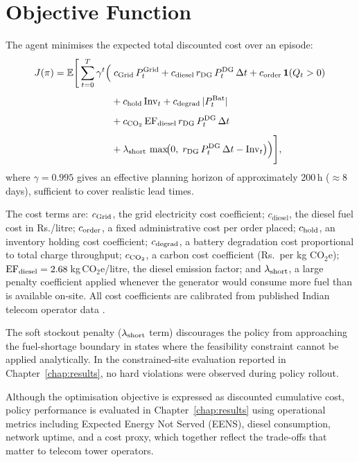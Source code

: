 \section{Objective Function}
\label{sec:objective}

The agent minimises the expected total discounted cost over an episode:
\begin{align}
J(\pi) = \mathbb{E}\Biggl[\,\sum_{t=0}^{T} \gamma^t \Bigl(
    &\;c_{\mathrm{Grid}}\,P_t^{\mathrm{Grid}}
     + c_{\mathrm{diesel}}\,r_{\mathrm{DG}}\,P_t^{\mathrm{DG}}\,\Delta t
     + c_{\mathrm{order}}\,\mathbf{1}(Q_t > 0)
     \notag \\[4pt]
    &+ c_{\mathrm{hold}}\,\mathrm{Inv}_t
     + c_{\mathrm{degrad}}\,|P_t^{\mathrm{Bat}}|
     \notag \\[4pt]
    &+ c_{\mathrm{CO_2}}\,\mathrm{EF}_{\mathrm{diesel}}\,r_{\mathrm{DG}}\,P_t^{\mathrm{DG}}\,\Delta t
     \notag \\[4pt]
    &+ \lambda_{\mathrm{short}}\,\max\!\bigl(0,\;
       r_{\mathrm{DG}}\,P_t^{\mathrm{DG}}\,\Delta t - \mathrm{Inv}_t\bigr)
\Bigr)\Biggr],
\label{eq:objective}
\end{align}
where $\gamma = 0.995$ gives an effective planning horizon of approximately
200\,h ($\approx 8$\,days), sufficient to cover realistic lead times.

The cost terms are: $c_{\mathrm{Grid}}$, the grid electricity cost coefficient;
$c_{\mathrm{diesel}}$, the diesel fuel cost in Rs./litre; $c_{\mathrm{order}}$, a
fixed administrative cost per order placed; $c_{\mathrm{hold}}$, an inventory
holding cost coefficient; $c_{\mathrm{degrad}}$, a battery degradation cost
proportional to total charge throughput; $c_{\mathrm{CO_2}}$, a carbon cost
coefficient (Rs.\ per kg CO$_2$e); $\mathrm{EF}_{\mathrm{diesel}} = 2.68$\,kg\,CO$_2$e/litre,
the diesel emission factor; and $\lambda_{\mathrm{short}}$, a large penalty
coefficient applied whenever the generator would consume more fuel than is
available on-site. All cost coefficients are calibrated from published Indian telecom
operator data \cite{IOCL_Prices2024, SERC_Tariff2024, Operator_Diesel2023}.

The soft stockout penalty ($\lambda_{\mathrm{short}}$ term) discourages the policy
from approaching the fuel-shortage boundary in states where the feasibility
constraint cannot be applied analytically. In the constrained-site evaluation
reported in Chapter~\ref{chap:results}, no hard violations were observed during
policy rollout.

Although the optimisation objective is expressed as discounted cumulative
cost, policy performance is evaluated in Chapter~\ref{chap:results} using
operational metrics including Expected Energy Not Served (EENS), diesel
consumption, network uptime, and a cost proxy, which together reflect the
trade-offs that matter to telecom tower operators.

